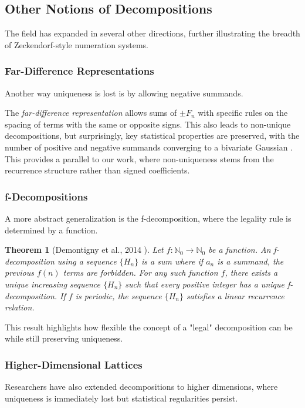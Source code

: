 \documentclass[11pt]{amsart}
\theoremstyle{plain}
\numberwithin{equation}{section} %
\newtheorem{theorem}[thm]{Theorem}
\numberwithin{table}{section} %
\numberwithin{figure}{section}
\begin{document}
	
	
	
	
	\subsection{Other Notions of Decompositions}
	The field has expanded in several other directions, further illustrating the breadth of Zeckendorf-style numeration systems.
	
	
	\subsubsection{Far-Difference Representations}
	Another way uniqueness is lost is by allowing negative summands.
	
	The {\it far-difference representation} allows sums of $\pm F_n$ with specific rules on the spacing of terms with the same or opposite signs. 
	This also leads to non-unique decompositions, but surprisingly, key statistical properties are preserved, with the number of positive and negative summands converging to a bivariate Gaussian \cite{miller2016far}. This provides a parallel to our work, where non-uniqueness stems from the recurrence structure rather than signed coefficients.
	
	
	
	\subsubsection{f-Decompositions}
	A more abstract generalization is the f-decomposition, where the legality rule is determined by a function.
	
	\begin{theorem}[Demontigny et al., 2014 \cite{DemontignyEtAl2014}]
		Let $f: \mathbb{N}_0 \to \mathbb{N}_0$ be a function. An f-decomposition using a sequence $\{H_n\}$ is a sum where if $a_n$ is a summand, the previous $f(n)$ terms are forbidden. For any such function $f$, there exists a unique increasing sequence $\{H_n\}$ such that every positive integer has a unique f-decomposition. If $f$ is periodic, the sequence $\{H_n\}$ satisfies a linear recurrence relation.
	\end{theorem}
	This result highlights how flexible the concept of a "legal" decomposition can be while still preserving uniqueness.
	
	\subsubsection{Higher-Dimensional Lattices}
	Researchers have also extended decompositions to higher dimensions, where uniqueness is immediately lost but statistical regularities persist.
	
\end{document}

